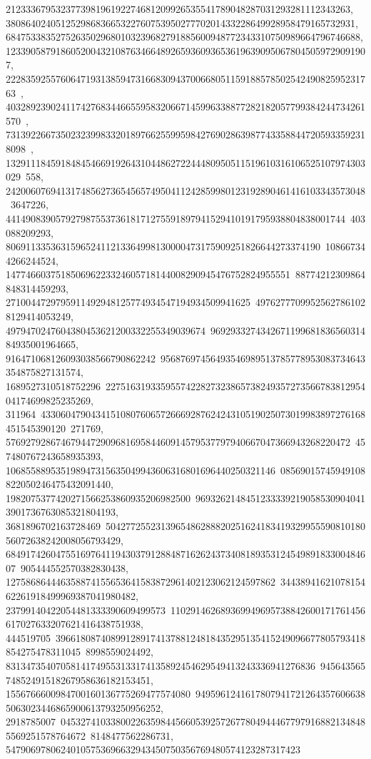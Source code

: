 {{{   212333679532377398196192274681209926535541789048287031293281112343263, 
   3808640240512529868366532276075395027770201433228649928958479165732931, 
   68475338352752635029680103239682791885600948772343310750989664796746688, 
   1233905879186052004321087634664892659360936536196390950678045059729091907, 
   22283592557606471931385947316683094370066805115918857850254249082595231763\
, 
   403289239024117427683446655958320667145996338877282182057799384244734261570\
, 
   7313922667350232399833201897662559959842769028639877433588447205933592318098\
, 132911184591848454669192643104486272244480950511519610316106525107974303029\
558, 242006076941317485627365456574950411242859980123192890461416103343573048\
3647226, 44149083905792798755373618171275591897941529410191795938804838001744\
403088209293, 806911335363159652411213364998130000473175909251826644273374190\
108667344266244524, 147746603751850696223324605718144008290945476752824955551\
88774212309864848314459293, 2710044729795911492948125774934547194934509941625\
49762777099525627861028129414053249, 4979470247604380453621200332255349039674\
969293327434267119968183656031484935001964665, 916471068126093038566790862242\
95687697456493546989513785778953083734643354875827131574, 1689527310518752296\
227516319335955742282732386573824935727356678381295404174699825235269, 311964\
43306047904341510807606572666928762424310519025073019983897276168451545390120\
271769, 576927928674679447290968169584460914579537797940667047366943268220472\
457480767243658935393, 106855889535198947315635049943606316801696440250321146\
08569015745949108822050246475432091440, 1982075377420271566253860935206982500\
96932621484512333392190585309040413901736763085321804193, 3681896702163728469\
504277255231396548628882025162418341932995559081018056072638242008056793429, 
   68491742604755169764119430379128848716262437340818935312454989183300484607\
905444552570382830438, 127586864446358874155653641583872961402123062124597862\
3443894162107815462261918499969387041980482, 23799140422054481333390609499573\
110291462689369949695738842600171761456617027633207621416438751938, 444519705\
39661808740899128917413788124818435295135415249096677805793418854275478311045\
8998559024492, 83134735407058141749553133174135892454629549413243336941276836\
94564356574852491518267958636182153451, 1556766600984700160136775269477574080\
94959612416178079417212643576066385063023446865900613793250956252, 2918785007\
04532741033800226359844566053925726778049444677979168821348485569251578764672\
8148477562286731, 54790697806240105753696632943450750356769480574123287317423\
}}}
